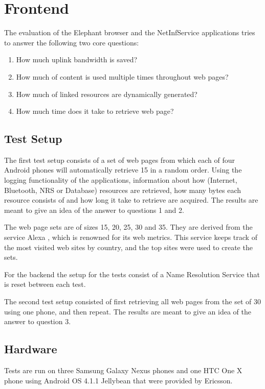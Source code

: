 \section{Frontend}

The evaluation of the Elephant browser and the NetInfService applications tries to answer the following two core questions:

\begin{enumerate}
\item How much uplink bandwidth is saved?
\item How much of content is used multiple times throughout web pages?
\item How much of linked resources are dynamically generated?
\item How much time does it take to retrieve web page?
\end{enumerate}

\subsection{Test Setup}

The first test setup consists of a set of web pages from which each of four Android phones will automatically retrieve 15 in a random order. Using the logging functionality of the applications, information about how (Internet, Bluetooth, NRS or Database) resources are retrieved, how many bytes each resource consists of and how long it take to retrieve are acquired. The results are meant to give an idea of the answer to questions 1 and 2.

The web page sets are of sizes 15, 20, 25, 30 and 35. They are derived from the service Alexa \cite{alexa}, which is renowned for its web metrics. This service keeps track of the most visited web sites by country, and the top sites were used to create the sets.

For the backend the setup for the tests consist of a Name Resolution Service that is reset between each test.

The second test setup consisted of first retrieving all web pages from the set of 30 using one phone, and then repeat. The results are meant to give an idea of the answer to question 3.

\subsection{Hardware}

Tests are run on three Samsung Galaxy Nexus phones and one HTC One X phone using Android OS 4.1.1 Jellybean that were provided by Ericsson.

